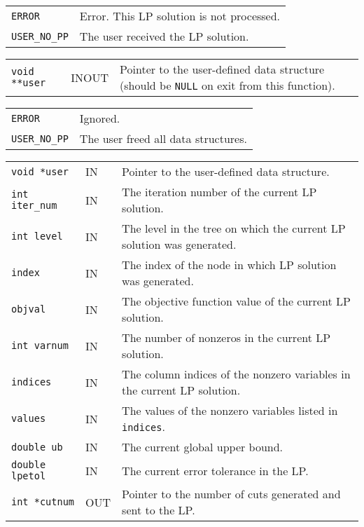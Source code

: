 \documentclass[twoside,11pt]{article}
\begin{document}
{\newpage
\clearpage
\samepage \begin{tabular}{lp{300pt}}
{\tt ERROR} & Error. This LP solution is not processed. \\ 
{\tt USER\_NO\_PP} & The user received the LP solution. \\ 
\end{tabular}
}

{\newpage
\clearpage
\samepage \begin{tabular}{llp{280pt}}
{\tt void **user} & INOUT & Pointer to the user-defined data structure
(should be {\tt NULL} on exit from this function). \\ 
\end{tabular}
}

{\newpage
\clearpage
\samepage \begin{tabular}{lp{300pt}}
{\tt ERROR} & Ignored. \\ 
{\tt USER\_NO\_PP} & The user freed all data structures. \\ 
\end{tabular}
}

{\newpage
\clearpage
\samepage \begin{tabular}{llp{280pt}}
{\tt void *user} & IN & Pointer to the user-defined data structure.
\\ 
{\tt int iter\_num} & IN & The iteration number of the current LP solution. \\ 
{\tt int level} & IN & The level in the tree on which the current LP
solution was generated. \\ 
{\tt index} & IN & The index of the node in which LP solution was generated.
\\ 
{\tt objval} & IN & The objective function value of the current LP solution.
\\ 
{\tt int varnum} & IN & The number of nonzeros in the current LP solution. \\ 
{\tt indices} & IN & The column indices of the nonzero variables in the current
LP solution. \\ 
{\tt values} & IN & The values of the nonzero variables listed in 
{\tt indices}.
\\ 
{\tt double ub} & IN & The current global upper bound. \\ 
{\tt double lpetol} & IN & The current error tolerance in the LP. \\ 
{\tt int *cutnum} & OUT & Pointer to the number of cuts generated
and sent to the LP. \\ 
\end{tabular}
}
\end{document}

